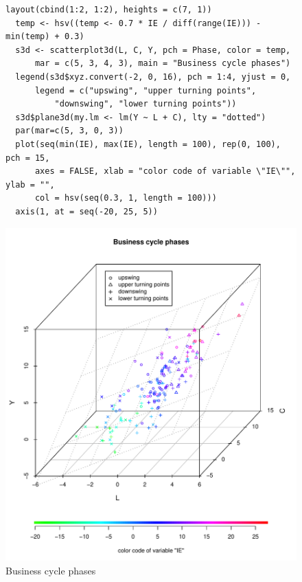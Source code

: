 \begin{figure}[H]
\vspace*{-10mm}
\footnotesize
\begin{Verbatim}[frame=single]
  layout(cbind(1:2, 1:2), heights = c(7, 1))
  temp <- hsv((temp <- 0.7 * IE / diff(range(IE))) - min(temp) + 0.3)
  s3d <- scatterplot3d(L, C, Y, pch = Phase, color = temp,
      mar = c(5, 3, 4, 3), main = "Business cycle phases")
  legend(s3d$xyz.convert(-2, 0, 16), pch = 1:4, yjust = 0,
      legend = c("upswing", "upper turning points",
          "downswing", "lower turning points"))
  s3d$plane3d(my.lm <- lm(Y ~ L + C), lty = "dotted")
  par(mar=c(5, 3, 0, 3))
  plot(seq(min(IE), max(IE), length = 100), rep(0, 100), pch = 15,
      axes = FALSE, xlab = "color code of variable \"IE\"", ylab = "",
      col = hsv(seq(0.3, 1, length = 100)))
  axis(1, at = seq(-20, 25, 5))
\end{Verbatim}
\normalsize
\begin{center}\includegraphics[width=13cm]{business}\end{center}
\vspace*{-5mm}\caption{Business cycle phases\label{business}}
\end{figure}

